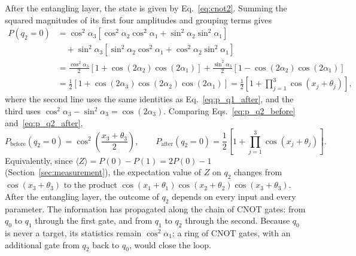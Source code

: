 \documentclass[12pt]{article}
\numberwithin{equation}{section}  %
\begin{document}
After the entangling layer, the state is given by Eq.~\eqref{eq:cnot2}. Summing the squared magnitudes of its first four amplitudes and grouping terms gives
\begin{equation}
\begin{aligned}
P(q_2 = 0)
&= \cos^2\alpha_3 \left[\cos^2\alpha_2 \cos^2\alpha_1 + \sin^2\alpha_2 \sin^2\alpha_1\right] \\
&\quad + \sin^2\alpha_3 \left[\sin^2\alpha_2 \cos^2\alpha_1 + \cos^2\alpha_2 \sin^2\alpha_1\right] \\
&= \frac{\cos^2\alpha_3}{2}\left[1 + \cos(2\alpha_2)\cos(2\alpha_1)\right]
 + \frac{\sin^2\alpha_3}{2}\left[1 - \cos(2\alpha_2)\cos(2\alpha_1)\right] \\
&= \frac{1}{2}\left[1 + \cos(2\alpha_3)\cos(2\alpha_2)\cos(2\alpha_1)\right]
= \frac{1}{2}\left[1 + \prod_{j=1}^{3}\cos(x_j + \theta_j)\right],
\end{aligned}
\label{eq:p_q2_after}
\end{equation}
where the second line uses the same identities as Eq.~\eqref{eq:p_q1_after}, and the third uses $\cos^2\alpha_3 - \sin^2\alpha_3 = \cos(2\alpha_3)$. Comparing Eqs.~\eqref{eq:p_q2_before} and~\eqref{eq:p_q2_after},
\begin{equation}
P_{\text{before}}(q_2 = 0) = \cos^2\!\left(\frac{x_3 + \theta_3}{2}\right),
\qquad
P_{\text{after}}(q_2 = 0) = \frac{1}{2}\left[1 + \prod_{j=1}^{3}\cos(x_j + \theta_j)\right].
\end{equation}
Equivalently, since $\langle Z \rangle = P(0) - P(1) = 2P(0) - 1$ (Section~\ref{sec:measurement}), the expectation value of $Z$ on $q_2$ changes from $\cos(x_3 + \theta_3)$ to the product $\cos(x_1 + \theta_1)\cos(x_2 + \theta_2)\cos(x_3 + \theta_3)$. After the entangling layer, the outcome of $q_2$ depends on every input and every parameter. The information has propagated along the chain of CNOT gates: from $q_0$ to $q_1$ through the first gate, and from $q_1$ to $q_2$ through the second. Because $q_0$ is never a target, its statistics remain $\cos^2\alpha_1$; a ring of CNOT gates, with an additional gate from $q_2$ back to $q_0$, would close the loop.
\end{document}
